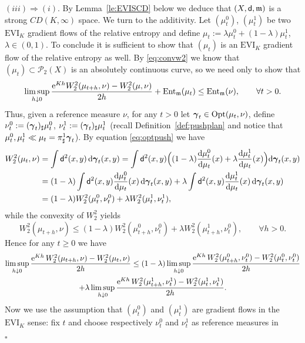 \documentclass[reqno,11pt]{article}
\numberwithin{equation}{section}
\newcommand{\mm}{{\mbox{\boldmath$m$}}}
\newcommand{\ggamma}{{\mbox{\boldmath$\gamma$}}}
\newcommand{\sfd}{{\sf d}}
\newcommand{\rme}{{\mathrm e}}
\renewcommand{\d}{{\mathrm d}}
\newcommand{\EVI}[4]{\mathrm{EVI}_{#4}(#1,{#2}_W,#3)}
\newcommand{\ProbabilitiesTwo}[1]{\mathscr P_2(#1)}     %
\newenvironment{proof}{\removelastskip\par\medskip   %
\noindent{\em Proof.}
\rm}{\penalty-20\null\hfill$\square$\par\medbreak}
\newcommand{\probt}{\ProbabilitiesTwo}
\newcommand{\opt}[2]{{\rm{Opt}}(#1,#2)}
\newcommand{\entr}[2]{{\rm Ent}_{#2}(#1)}              %
\renewcommand{\EVI}{\ensuremath{\mathrm{EVI}}}
\renewcommand{\mm}{\mathfrak m}
\begin{document}
\begin{proof}
\noindent$(iii)\Rightarrow(i)$. By Lemma~\ref{le:EVISCD} below we
deduce that $(X,\sfd,\mm)$ is a strong $CD(K,\infty)$ space.
 We turn to the additivity. Let $(\mu_t^0)$, $(\mu^1_t)$ be two
$\EVI_K$ gradient flows of the relative entropy and define
$\mu_t:=\lambda\mu^0_t+(1-\lambda)\mu^1_t$, $\lambda\in(0,1)$. To
conclude it is sufficient to show that $(\mu_t)$ is an $\EVI_K$
gradient flow of the relative entropy as well. By \eqref{eq:convw2}
we know that $(\mu_t)\subset\probt X$ is an absolutely continuous
curve, so we need only to show that
\begin{equation}
\label{eq:puntuale} \limsup_{h\downarrow0}\frac{\rme^{Kh}
W_2^2(\mu_{t+h},\nu)-W_2^2(\mu,\nu)}{2h}
+\entr{\mu_t}\mm\leq\entr\nu\mm,\qquad\forall t>0.
\end{equation}
Thus, given a reference measure $\nu$, for any $t>0$ let
$\ggamma_t\in\opt{\mu_t}{\nu}$, define
$\nu^0_t:=(\ggamma_t)_\sharp\mu^0_t$,
$\nu^1_t:=(\ggamma_t)_\sharp\mu^1_t$ (recall
Definition~\ref{def:pushplan} and notice that
$\mu^0_t,\mu^1_t\ll\mu_t=\pi^1_\sharp\ggamma_t$). By equation
\eqref{eq:optpush} we have
\[
\begin{split}
W_2^2(\mu_t,\nu)&=\int \sfd^2(x,y)\,\d\ggamma_t(x,y)=
\int \sfd^2(x,y)\Big((1-\lambda)\frac{\d\mu^0_t}{\d\mu_t}(x)+\lambda\frac{\d\mu^1_t}{\d\mu_t}(x)\Big)\d\ggamma_t(x,y)\\
&=(1-\lambda)\int \sfd^2(x,y)\frac{\d\mu^0_t}{\d\mu_t}(x)\,\d\ggamma_t(x,y)
+\lambda\int \sfd^2(x,y)\frac{\d\mu^1_t}{\d\mu_t}(x)\,\d\ggamma_t(x,y)\\
&=(1-\lambda)W_2^2(\mu^0_t,\nu^0_t)+\lambda W_2^2(\mu^1_t,\nu^1_t),
\end{split}
\]
while the convexity of $W_2^2$ yields
\[
W_2^2(\mu_{t+h},\nu)\leq(1-\lambda)W_2^2(\mu^0_{t+h},\nu^0_t)+\lambda W_2^2(\mu^1_{t+h},\nu^0_t),\qquad\forall h>0.
\]
Hence for any $t\geq 0$ we have
\begin{gather}
\notag \limsup_{h\downarrow0}
\frac{\rme^{Kh}\,W_2^2(\mu_{t+h},\nu)-W_2^2(\mu_t,\nu)}{2h} \leq
(1-\lambda) \limsup_{h\downarrow0}\frac{\rme^{Kh}\,
W_2^2(\mu^0_{t+h},\nu^0_t)-W_2^2(\mu^0_t,\nu^0_t)}{2h}
\\
+\lambda\limsup_{h\downarrow0}\frac{\rme^{Kh}\,
W_2^2(\mu_{t+h}^1,\nu^1_t)-W_2^2(\mu^1_t,\nu^1_t)}{2h}.
\label{eq:euno}
\end{gather}
Now we use the assumption that $(\mu^0_t)$ and $(\mu^1_t)$ are
gradient flows in the $\EVI_K$ sense: fix $t$ and choose
respectively $\nu^0_t$ and $\nu^1_t$ as reference measures in

\end{proof}
\end{document}
